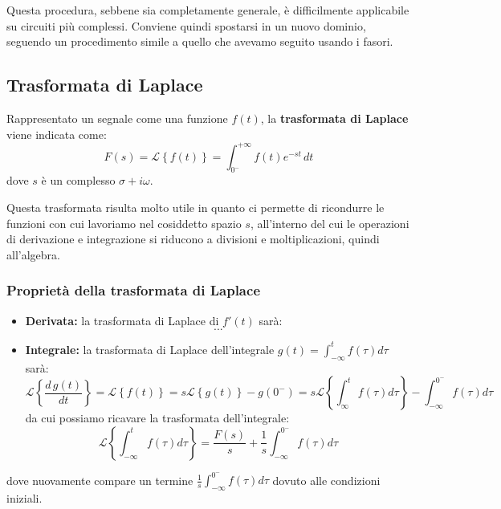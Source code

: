 \documentclass[a4paper,11pt]{article}
\begin{document}
Questa procedura, sebbene sia completamente generale, è difficilmente applicabile su circuiti più complessi.
Conviene quindi spostarsi in un nuovo dominio, seguendo un procedimento simile a quello che avevamo seguito usando i fasori.

\subsection{Trasformata di Laplace}
Rappresentato un segnale come una funzione $f(t)$, la \textbf{trasformata di Laplace} viene indicata come:
$$
F(s) = \mathcal{L} \left\{ f(t) \right\} = \int_{0^-}^{+\infty} f(t)e^{-st} \, dt
$$
dove $s$ è un complesso $\sigma + i \omega$.

Questa trasformata risulta molto utile in quanto ci permette di ricondurre le funzioni con cui lavoriamo nel cosiddetto spazio $s$, all'interno del cui le operazioni di derivazione e integrazione si riducono a divisioni e moltiplicazioni, quindi all'algebra.

\subsubsection{Proprietà della trasformata di Laplace}
\begin{itemize}
	\item \textbf{Derivata:} la trasformata di Laplace di $f'(t)$ sarà:
		$$
			...
		$$
\item \textbf{Integrale:} la trasformata di Laplace dell'integrale $g(t) = \int_{-\infty}^t f(\tau) d\tau$ sarà:
		$$
		\mathcal{L}\left\{ \frac{d\,g(t)}{dt} \right\} = \mathcal{L}\left\{ f(t) \right\} = s \mathcal{L}\left\{ g(t) \right\} - g(0^-) =  s \mathcal{L}\left\{ \int_\infty^t f(\tau) d\tau \right\} - \int_{-\infty}^{0^-} f(\tau) d\tau
		$$
		da cui possiamo ricavare la trasformata dell'integrale:
		$$
		\mathcal{L}\left\{ \int_{-\infty}^t f(\tau) d\tau \right\} = \frac{F(s)}{s} + \frac{1}{s} \int_{-\infty}^{0^-} f(\tau) d \tau
		$$
\end{itemize}
dove nuovamente compare un termine $\frac{1}{s} \int_{-\infty}^{0^-} f(\tau) d \tau$ dovuto alle condizioni iniziali.

\TODO %
\end{document}
